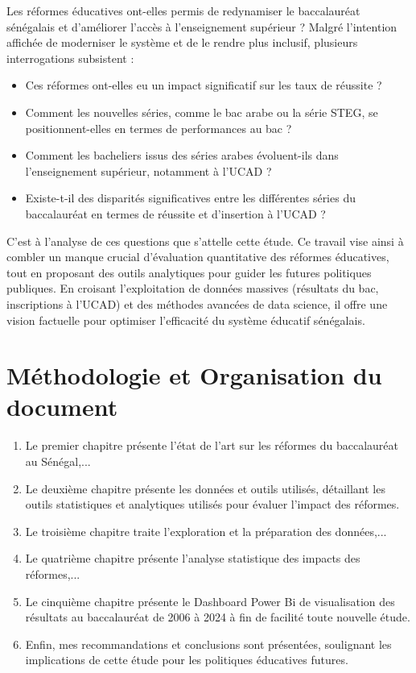 Les réformes éducatives ont-elles permis de redynamiser le baccalauréat sénégalais et d’améliorer l’accès à l’enseignement supérieur ? 
Malgré l’intention affichée de moderniser le système et de le rendre plus inclusif, plusieurs interrogations subsistent :
\begin{itemize}
    \item Ces réformes ont-elles eu un impact significatif sur les taux de réussite ?
    \item Comment les nouvelles séries, comme le bac arabe ou la série STEG, se positionnent-elles en termes de performances au bac ?
    \item Comment les bacheliers issus des séries arabes évoluent-ils dans l’enseignement supérieur, notamment à l’UCAD ?
    \item Existe-t-il des disparités significatives entre les différentes séries du baccalauréat en termes de réussite et d’insertion à l'UCAD ?
\end{itemize}

C'est à l'analyse de ces questions que s'attelle cette étude.
Ce travail vise ainsi à combler un manque crucial d’évaluation quantitative des réformes éducatives, 
tout en proposant des outils analytiques pour guider les futures politiques publiques. 
En croisant l’exploitation de données massives (résultats du bac, inscriptions à l’UCAD) et des méthodes avancées de data science, 
il offre une vision factuelle pour optimiser l’efficacité du système éducatif sénégalais.

\section*{Méthodologie et Organisation du document}

\begin{enumerate}
    \item Le premier chapitre présente l'état de l’art sur les réformes du baccalauréat au Sénégal,...
    \item Le deuxième chapitre présente les données et outils utilisés, détaillant les outils statistiques et analytiques utilisés pour évaluer l'impact des réformes.
    \item Le troisième chapitre traite l'exploration et la préparation des données,...
    \item Le quatrième chapitre présente l'analyse statistique des impacts des réformes,...
    \item Le cinquième chapitre présente le Dashboard Power Bi de visualisation des résultats au baccalauréat de 2006 à 2024 à fin de facilité toute nouvelle étude.
    \item Enfin, mes recommandations et conclusions sont présentées, soulignant les implications de cette étude pour les politiques éducatives futures.
\end{enumerate}